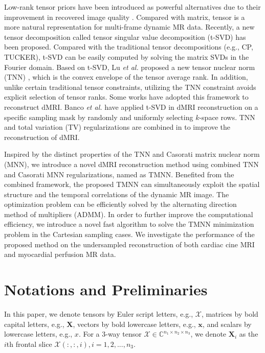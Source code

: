 \documentclass{article}
\begin{document}
Low-rank tensor priors have been introduced as powerful alternatives due to their improvement in recovered image quality \cite{ref_tensor,ref_tucker1,ref_wmnn}. 
Compared with matrix, tensor is a more natural representation for multi-frame dynamic MR data. Recently, a new tensor decomposition called tensor singular value decomposition (t-SVD) \cite{ref_tsvd} has been proposed. Compared with the traditional tensor decompositions (e.g., CP, TUCKER), t-SVD can be easily computed by solving the matrix SVDs in the Fourier domain. Based on t-SVD, Lu \emph{et al.} proposed a new tensor nuclear norm (TNN) \cite{ref_tnn1}, which is the convex envelope of the tensor average rank. In addition, unlike certain traditional tensor constraints, utilizing the TNN constraint avoids explicit selection of tensor ranks. Some works have adopted this framework to reconstruct dMRI. Banco \emph{et al.} \cite{ref_tnn_dmri1} have applied t-SVD in dMRI reconstruction on a specific sampling mask by randomly and uniformly selecting $k$-space rows. TNN and total variation (TV) regularizations are combined in \cite{ref_tnn_dmri2} to improve the reconstruction of dMRI. %

Inspired by the distinct properties of the TNN and Casorati matrix nuclear norm (MNN), we introduce a novel dMRI reconstruction method using combined TNN and Casorati MNN regularizations, named as TMNN. Benefited from the combined framework, the proposed TMNN can simultaneously exploit the spatial structure and the temporal correlations of the dynamic MR image. The optimization problem can be efficiently solved by the alternating direction method of multipliers (ADMM). In order to further improve the computational efficiency, we introduce a novel fast algorithm to solve the TMNN minimization problem in the Cartesian sampling cases. We investigate the performance of the proposed method on the undersampled reconstruction of both cardiac cine MRI and myocardial perfusion MR data. 

\section{Notations and Preliminaries}
\label{sec:Notations}

In this paper, we denote tensors by Euler script letters, e.g., $\mathcal{X}$, matrices by bold capital letters, e.g., $\mathbf{X}$, vectors by bold lowercase letters, e.g., $\mathbf{x}$, and scalars by lowercase letters, e.g., $x$. For a 3-way tensor $\mathcal{X} \in \mathbb{C}^{n_1 \times n_2 \times n_3}$, we denote $\mathbf X_i$ as the $i$th frontal slice $\mathcal{X}(:,:,i),i=1,2,...,n_3$.
\end{document}
